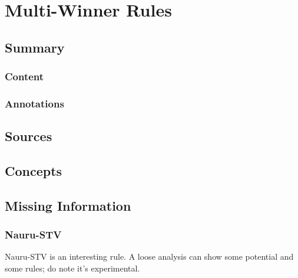 \chapter{Multi-Winner Rules}

\section{Summary}

\subsection{Content}


\subsection{Annotations}

\section{Sources}


\section{Concepts}

\section{Missing Information}

\subsection{Nauru-STV}

Nauru-STV is an interesting rule.  A loose analysis can show some potential and some rules; do note it's experimental.